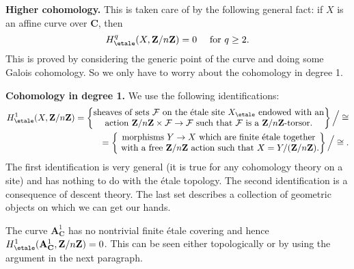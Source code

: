 \medskip\noindent
{\bf Higher cohomology.} This is taken care of by the following general
fact: if $X$ is an affine curve over $\mathbf{C}$, then
$$
H_\etale^q (X, \mathbf{Z}/n\mathbf{Z}) = 0 \quad \text{ for } q \geq 2.
$$
This is proved by considering the generic point of the curve and doing some
Galois cohomology. So we only have to worry about the cohomology in degree 1.

\medskip\noindent
{\bf Cohomology in degree 1.} We use the following identifications:
\begin{eqnarray*}
H_\etale^1 (X, \mathbf{Z}/n\mathbf{Z}) = \left\{
\begin{matrix}
\text{sheaves of sets }\mathcal{F}\text{ on the \'etale site }X_\etale
\text{ endowed with an} \\
\text{action }\mathbf{Z}/n\mathbf{Z} \times \mathcal{F} \to \mathcal{F}
\text{ such that }\mathcal{F}\text{ is a }\mathbf{Z}/n\mathbf{Z}\text{-torsor.}
\end{matrix}
\right\}
\Big/ \cong
\\
 = \left\{
\begin{matrix}
\text{morphisms }Y \to X\text{ which are finite \'etale together} \\
\text{ with a free }\mathbf{Z}/n\mathbf{Z}\text{ action such that }
X = Y/(\mathbf{Z}/n\mathbf{Z}).
\end{matrix}
\right\}
\Big/ \cong.
\end{eqnarray*}
The first identification is very general (it is true for any cohomology theory
on a site) and has nothing to do with the \'etale topology. The second
identification is a consequence of descent theory. The last set describes a
collection of geometric objects on which we can get our hands.

\medskip\noindent
The curve $\mathbf{A}^1_\mathbf{C}$ has no nontrivial finite \'etale covering
and hence
$H_\etale^1 (\mathbf{A}^1_\mathbf{C}, \mathbf{Z}/n\mathbf{Z}) = 0$.
This can be seen either topologically or by using the argument in the next
paragraph.

